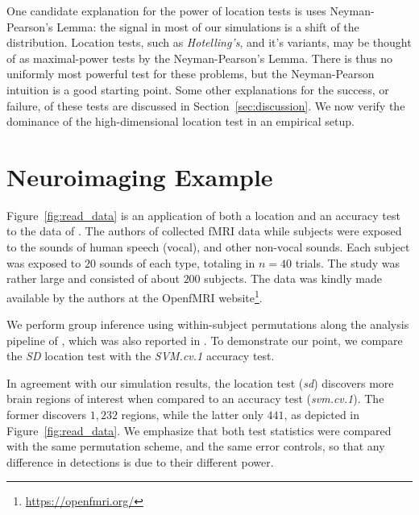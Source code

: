 \documentclass[12pt,a4paper]{article}
\begin{document}
One candidate explanation for the power of location tests is uses Neyman-Pearson's Lemma: the signal in most of our simulations is a shift of the distribution. 
Location tests, such as \emph{Hotelling's}, and it's variants, may be thought of as maximal-power tests by the Neyman-Pearson's Lemma. 
There is thus no uniformly most powerful test for these problems, but the Neyman-Pearson intuition is a good starting point. 
Some other explanations for the success, or failure, of these tests are discussed in Section~\ref{sec:discussion}. 
We now verify the dominance of the high-dimensional location test in an empirical setup. 





\section{Neuroimaging Example}
\label{sec:example}

Figure~\ref{fig:read_data} is an application of both a location and an accuracy test to the data of \cite{pernet_human_2015}. 
The authors of \cite{pernet_human_2015} collected fMRI data while subjects were exposed to the sounds of human speech (vocal), and other non-vocal sounds. 
Each subject was exposed to $20$ sounds of each type, totaling in $n=40$ trials.
The study was rather large and consisted of about $200$ subjects.
The data was kindly made available by the authors at the OpenfMRI website\footnote{\url{https://openfmri.org/}}.

We perform group inference using within-subject permutations along the analysis pipeline of \cite{stelzer_statistical_2013}, which was also reported in \cite{gilron_quantifying_2016}. 
To demonstrate our point, we compare the \emph{SD} location test with the \emph{SVM.cv.1} accuracy test. 

In agreement with our simulation results, the location test (\emph{sd}) discovers more brain regions of interest when compared to an accuracy test (\emph{svm.cv.1}).
The former discovers $1,232$ regions, while the latter only $441$, as depicted in Figure~\ref{fig:read_data}.
We emphasize that both test statistics were compared with the same permutation scheme, and the same error controls, so that any difference in detections is due to their different power.
\end{document}
